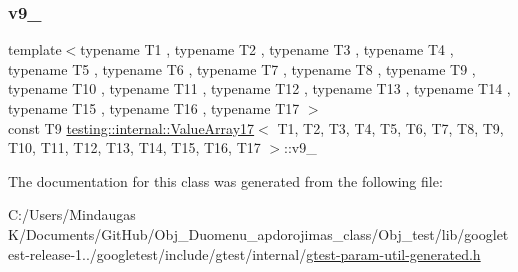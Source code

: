 \mbox{\label{classtesting_1_1internal_1_1_value_array17_a2776b6c20d7c1b397bdd14243aa44382}} 
\subsubsection{\texorpdfstring{v9\_}{v9\_}}
{\footnotesize\ttfamily template$<$typename T1 , typename T2 , typename T3 , typename T4 , typename T5 , typename T6 , typename T7 , typename T8 , typename T9 , typename T10 , typename T11 , typename T12 , typename T13 , typename T14 , typename T15 , typename T16 , typename T17 $>$ \\
const T9 \mbox{\hyperlink{classtesting_1_1internal_1_1_value_array17}{testing\+::internal\+::\+Value\+Array17}}$<$ T1, T2, T3, T4, T5, T6, T7, T8, T9, T10, T11, T12, T13, T14, T15, T16, T17 $>$\+::v9\+\_\+\hspace{0.3cm}{\ttfamily [private]}}



The documentation for this class was generated from the following file\+:\begin{DoxyCompactItemize}
\item 
C\+:/\+Users/\+Mindaugas K/\+Documents/\+Git\+Hub/\+Obj\+\_\+\+Duomenu\+\_\+apdorojimas\+\_\+class/\+Obj\+\_\+test/lib/googletest-\/release-\/1../googletest/include/gtest/internal/\mbox{\hyperlink{gtest-param-util-generated_8h}{gtest-\/param-\/util-\/generated.\+h}}\end{DoxyCompactItemize}

